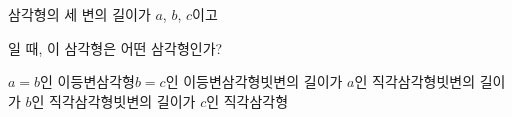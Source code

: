 삼각형의 세 변의 길이가 $a$, $b$, $c$이고\par\smallskip{}\par\smallskip\noindent 일 때, 이 삼각형은 어떤 삼각형인가?
\begin{choicesv}{$a=b$인 이등변삼각형}{$b=c$인 이등변삼각형}{빗변의 길이가 $a$인 직각삼각형}{빗변의 길이가 $b$인 직각삼각형}{빗변의 길이가 $c$인 직각삼각형}\end{choicesv}
